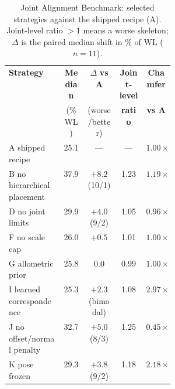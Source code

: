 \begin{table}[!htb]
\centering
\caption{Joint Alignment Benchmark: selected strategies against the shipped
recipe (A). Joint-level ratio $>1$ means a worse skeleton; $\Delta$ is the
paired median shift in \% of WL ($n=11$).}
\label{tab:jab}
\begin{tabular}{@{}L{0.33\linewidth}cccc@{}}
\toprule
\textbf{Strategy} & \textbf{Median} & $\Delta$ \textbf{vs A} & \textbf{Joint-level} & \textbf{Chamfer}\\
 & (\% WL) & (worse/better) & \textbf{ratio} & \textbf{vs A}\\
\midrule
A\; shipped recipe & 25.1 & --- & --- & $1.00\times$\\
B\; no hierarchical placement & 37.9 & $+8.2$ (10/1) & 1.23 & $1.19\times$\\
D\; no joint limits & 29.9 & $+4.0$ (9/2) & 1.05 & $0.96\times$\\
F\; no scale cap & 26.0 & $+0.5$ & 1.01 & $1.00\times$\\
G\; allometric prior & 25.8 & $0.0$ & 0.99 & $1.00\times$\\
I\; learned correspondence & 25.3 & $+2.3$ (bimodal) & 1.08 & $2.97\times$\\
J\; no offset/normal penalty & 32.7 & $+5.0$ (8/3) & 1.25 & $0.45\times$\\
K\; pose frozen & 29.3 & $+3.8$ (9/2) & 1.18 & $2.18\times$\\
\bottomrule
\end{tabular}
\end{table}

